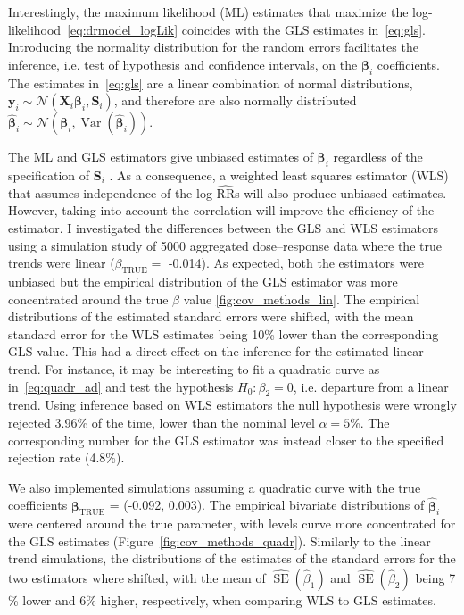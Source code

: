 \documentclass[11pt,a4paper,twoside,openany]{book}\usepackage{knitr}
\DeclareMathOperator{\Var}{Var}
\DeclareMathOperator{\SE}{SE}
\begin{document}
{{\noindent Interestingly, the maximum likelihood (ML) estimates that maximize the log-likelihood~\ref{eq:drmodel_logLik} coincides with the GLS estimates in~\ref{eq:gls}. Introducing the normality distribution for the random errors facilitates the inference, i.e. test of hypothesis and confidence intervals, on the $\boldsymbol{\beta}_i$ coefficients. The estimates in~\ref{eq:gls} are a linear combination of normal distributions, $\mathbf{y}_i \sim \mathcal{N}\left(\mathbf{X}_i \boldsymbol{\beta}_i, \mathbf{S}_i \right)$, and therefore are also normally  distributed $\boldsymbol{\hat \beta}_i \sim \mathcal{N}\left( \boldsymbol{\beta}_i, {\Var} \left( \boldsymbol{\hat \beta}_i \right)\right)$.



The ML and GLS estimators give unbiased estimates of $\boldsymbol{\beta}_i$ regardless of the specification of $\mathbf{S}_i$ \citep{orsini2006generalized}. As a consequence, a weighted least squares estimator (WLS) that assumes independence of the log $\widehat{\mathrm{RR}}$s will also produce unbiased estimates. However, taking into account the correlation will improve the efficiency of the estimator. 
I investigated the differences between the GLS and WLS estimators using a simulation study of 5000 aggregated dose--response data where the true trends were linear ($\beta_\text{TRUE} =$ -0.014). As expected, both the estimators were unbiased but the empirical distribution of the GLS estimator was more concentrated around the true $\beta$ value \ref{fig:cov_methods_lin}. The empirical distributions of the estimated standard errors were shifted, with the mean standard error for the WLS estimates being 10\% lower than the corresponding GLS value. This had a direct effect on the inference for the estimated linear trend. For instance, it may be interesting to fit a quadratic curve as in~\ref{eq:quadr_ad} and test the hypothesis $H_0: \beta_2 = 0$, i.e. departure from a linear trend. Using inference based on WLS estimators the null hypothesis were wrongly rejected 3.96\% of the time, lower than the nominal level $\alpha = 5$\%. The corresponding number for the GLS estimator was instead closer to the specified rejection rate (4.8\%). 

\noindent We also implemented simulations assuming a quadratic curve with the true coefficients $\boldsymbol{\beta}_\text{TRUE}$ = (-0.092, 0.003). The empirical bivariate distributions of $ \boldsymbol{\hat \beta}_i$ were centered around the true parameter, with levels curve more concentrated for the GLS estimates (Figure~\ref{fig:cov_methods_quadr}). Similarly to the linear trend simulations, the distributions of the estimates of the standard errors for the two estimators where shifted, with the mean of $\widehat{\SE} \left( \hat \beta_1 \right)$ and $\widehat{\SE} \left( \hat \beta_2 \right)$ being 7 \% lower and 6\% higher, respectively, when comparing WLS to GLS estimates.

}}
\end{document}

